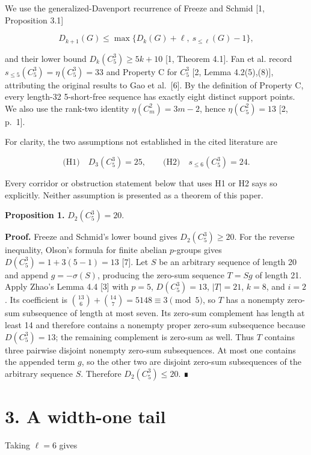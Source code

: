 \documentclass[
  11pt,
]{article}
\begin{document}
We use the generalized-Davenport recurrence of Freeze and Schmid {[}1,
Proposition 3.1{]}

\[
D_{k+1}(G)
\le\max\{D_k(G)+\ell, \ s_{\le\ell}(G)-1\},
\]

and their lower bound \(D_k(C_5^3)\ge5k+10\) {[}1, Theorem 4.1{]}. Fan
et al. record \(s_{\le5}(C_5^3)=\eta(C_5^3)=33\) and Property C for
\(C_5^3\) {[}2, Lemma 4.2(5),(8){]}, attributing the original results to
Gao et al.~{[}6{]}. By the definition of Property C, every length-32
5-short-free sequence has exactly eight distinct support points. We also
use the rank-two identity \(\eta(C_m^2)=3m-2\), hence \(\eta(C_5^2)=13\)
{[}2, p.~1{]}.

For clarity, the two assumptions not established in the cited literature
are

\[
\text{(H1)}\quad D_3(C_5^3)=25,
\qquad
\text{(H2)}\quad s_{\le6}(C_5^3)=24.
\]

Every corridor or obstruction statement below that uses H1 or H2 says so
explicitly. Neither assumption is presented as a theorem of this paper.

\textbf{Proposition 1.} \(D_2(C_5^3)=20\).

\textbf{Proof.} Freeze and Schmid's lower bound gives
\(D_2(C_5^3)\ge20\). For the reverse inequality, Olson's formula for
finite abelian \(p\)-groups gives \(D(C_5^3)=1+3(5-1)=13\) {[}7{]}. Let
\(S\) be an arbitrary sequence of length 20 and append \(g=-\sigma(S)\),
producing the zero-sum sequence \(T=Sg\) of length 21. Apply Zhao's
Lemma 4.4 {[}3{]} with \(p=5\), \(D(C_5^3)=13\), \(|T|=21\), \(k=8\),
and \(i=2\). Its coefficient is
\(\binom{13}{6}+\binom{14}{7}=5148\equiv3\pmod5\), so \(T\) has a
nonempty zero-sum subsequence of length at most seven. Its zero-sum
complement has length at least 14 and therefore contains a nonempty
proper zero-sum subsequence because \(D(C_5^3)=13\); the remaining
complement is zero-sum as well. Thus \(T\) contains three pairwise
disjoint nonempty zero-sum subsequences. At most one contains the
appended term \(g\), so the other two are disjoint zero-sum subsequences
of the arbitrary sequence \(S\). Therefore \(D_2(C_5^3)\le20\). ∎

\hypertarget{a-width-one-tail}{%
\section{3. A width-one tail}\label{a-width-one-tail}}

Taking \(\ell=6\) gives
\end{document}
